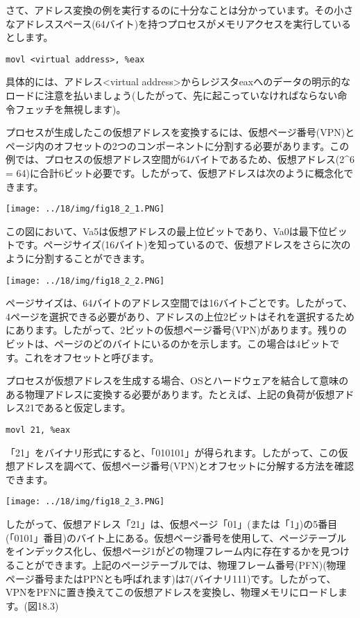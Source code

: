 さて、アドレス変換の例を実行するのに十分なことは分かっています。その小さなアドレススペース(64バイト)を持つプロセスがメモリアクセスを実行しているとします。

\begin{verbatim}
movl <virtual address>, %eax
\end{verbatim}

具体的には、アドレス\textless virtual
address\textgreater からレジスタeaxへのデータの明示的なロードに注意を払いましょう(したがって、先に起こっていなければならない命令フェッチを無視します)。

プロセスが生成したこの仮想アドレスを変換するには、仮想ページ番号(VPN)とページ内のオフセットの2つのコンポーネントに分割する必要があります。この例では、プロセスの仮想アドレス空間が64バイトであるため、仮想アドレス(2\^{}6
=
64)に合計6ビット必要です。したがって、仮想アドレスは次のように概念化できます。

\texttt{[image: ../18/img/fig18\_2\_1.PNG]}

この図において、Va5は仮想アドレスの最上位ビットであり、Va0は最下位ビットです。ページサイズ(16バイト)を知っているので、仮想アドレスをさらに次のように分割することができます。

\texttt{[image: ../18/img/fig18\_2\_2.PNG]}

ページサイズは、64バイトのアドレス空間では16バイトごとです。したがって、4ページを選択できる必要があり、アドレスの上位2ビットはそれを選択するためにあります。したがって、2ビットの仮想ページ番号(VPN)があります。残りのビットは、ページのどのバイトにいるのかを示します。この場合は4ビットです。これをオフセットと呼びます。

プロセスが仮想アドレスを生成する場合、OSとハードウェアを結合して意味のある物理アドレスに変換する必要があります。たとえば、上記の負荷が仮想アドレス21であると仮定します。

\begin{verbatim}
movl 21, %eax
\end{verbatim}

「21」をバイナリ形式にすると、「010101」が得られます。したがって、この仮想アドレスを調べて、仮想ページ番号(VPN)とオフセットに分解する方法を確認できます。

\texttt{[image: ../18/img/fig18\_2\_3.PNG]}

したがって、仮想アドレス「21」は、仮想ページ「01」(または「1」)の5番目(「0101」番目)のバイト上にある。仮想ページ番号を使用して、ページテーブルをインデックス化し、仮想ページ1がどの物理フレーム内に存在するかを見つけることができます。上記のページテーブルでは、物理フレーム番号(PFN)(物理ページ番号またはPPNとも呼ばれます)は7(バイナリ111)です。したがって、VPNをPFNに置き換えてこの仮想アドレスを変換し、物理メモリにロードします。(図18.3)


